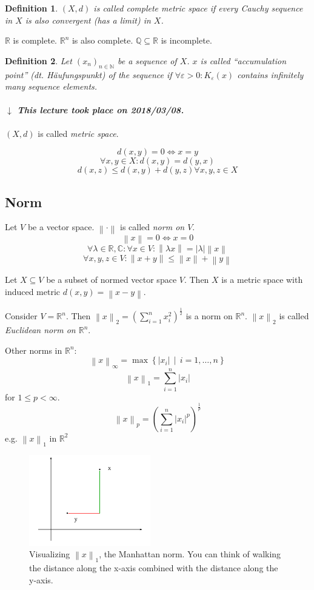 \documentclass{article}
\newtheorem{definition}{Definition}  \numberwithin{definition}{section}
\newcommand{\setdef}[2]{\left\{\left.#1\,\middle|\,#2\right.\right\}}
\newcommand{\norm}[1]{\left\|#1\right\|}
\newcommand{\card}[1]{\left|#1\right|}
\newcommand{\dateref}[1]{%
  \begin{mdframed}[backgroundcolor=gray!10,innerbottommargin=0pt,innertopmargin=0pt]
    \paragraph{\textit{$\downarrow$ This lecture took place on #1.}}%
  \end{mdframed}%
}
\begin{document}
\begin{definition}
  $(X, d)$ is called \emph{complete metric space} if every Cauchy sequence in $X$ is also convergent (has a limit) in $X$.
\end{definition}

$\mathbb R$ is complete. $\mathbb R^n$ is also complete. $\mathbb Q \subseteq \mathbb R$ is incomplete.

\begin{definition}
  Let $(x_n)_{n\in\mathbb N}$ be a sequence of $X$. $x$ is called \enquote{accumulation point} (\foreignlanguage{german}{dt. H\"aufungspunkt}) of the sequence if
  $\forall \varepsilon > 0: K_{\varepsilon}(x)$ contains infinitely many sequence elements.
\end{definition}

\dateref{2018/03/08}

$(X, d)$ is called \emph{metric space}.

\[ d(x,y) =0 \iff x = y \]
\[ \forall x,y \in X: d(x,y) = d(y,x) \]
\[ d(x,z) \leq d(x,y) + d(y,z) \forall x,y,z \in X \]

\subsection{Norm}

Let $V$ be a vector space. $\norm{\cdot}$ is called \emph{norm on $V$}.
\[ \norm{x} = 0 \iff x = 0 \]
\[ \forall \lambda \in \mathbb R, \mathbb C: \forall x \in V: \norm{\lambda x} = \card{\lambda} \norm{x} \]
\[ \forall x,y,z \in V: \norm{x + y} \leq \norm{x} + \norm{y} \]

Let $X \subseteq V$ be a subset of normed vector space $V$.
Then $X$ is a metric space with induced metric $d(x,y) = \norm{x - y}$.

Consider $V = \mathbb R^n$. Then $\norm{x}_2 = \left(\sum_{i=1}^n x_i^2\right)^{\frac12}$ is a norm on $\mathbb R^n$.
$\norm{x}_2$ is called \emph{Euclidean norm on $\mathbb R^n$}.

Other norms in $\mathbb R^n$:
\[ \norm{x}_{\infty} = \max\setdef{\card{x_i}}{i = 1,\dots,n} \]
\[ \norm{x}_1 = \sum_{i=1}^n \card{x_i} \]
for $1 \leq p < \infty$.
\[ \norm{x}_p = \left(\sum_{i=1}^n \card{x_i}^p\right)^{\frac1p} \]
e.g. $\norm{x}_1$ in $\mathbb R^2$

\begin{figure}[!ht]
  \begin{center}
    \includegraphics[width=200px]{img/02_1norm.pdf}
    \caption{Visualizing $\norm{x}_1$, the Manhattan norm. You can think of walking the distance along the x-axis combined with the distance along the y-axis.}
    \label{img:1norm}
  \end{center}
\end{figure}
\end{document}
